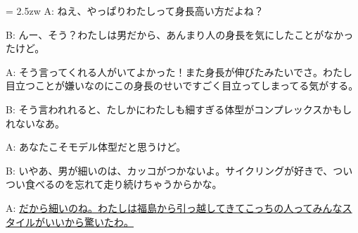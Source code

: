 \documentclass[11pt]{amsart}
\title{}
\author{}
\newenvironment{hangall}[1]{\hangindent = 2.5zw\everypar{\hangindent = 2.5zw}}{}
\begin{document}
\maketitle
\begin{hangall}{}%
A: ねえ、やっぱりわたしって身長高い方だよね？

B: んー、そう？わたしは男だから、あんまり人の身長を気にしたことがなかったけど。

A: そう言ってくれる人がいてよかった！また身長が伸びたみたいでさ。わたし目立つことが嫌いなのにこの身長のせいですごく目立ってしまってる気がする。

B: そう言われれると、たしかにわたしも細すぎる体型がコンプレックスかもしれないなあ。

A: あなたこそモデル体型だと思うけど。

B: いやあ、男が細いのは、カッコがつかないよ。サイクリングが好きで、ついつい食べるのを忘れて走り続けちゃうからかな。

A: \ul{だから細いのね。わたしは福島から引っ越してきてこっちの人ってみんなスタイルがいいから驚いたわ。}\end{hangall}
\end{document}
